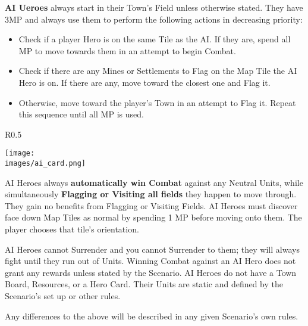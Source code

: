 \clearpage
\textbf{AI Ueroes} always start in their Town's Field unless otherwise stated.
They have 3MP and always use them to perform the following actions in decreasing priority:
\begin{itemize}
  \item Check if a player Hero is on the same Tile as the AI.
    If they are, spend all MP to move towards them in an attempt to begin Combat.
  \item Check if there are any Mines or Settlements to Flag on the Map Tile the AI Hero is on.
    If there are any, move toward the closest one and Flag it.
  \item Otherwise, move toward the player's Town in an attempt to Flag it.
Repeat this sequence until all MP is used.
\end{itemize}
\begin{wrapfigure}{R}{0.5\textwidth}
  \begin{center}
  \texttt{[image: \\images/ai\_card.png]}
  \end{center}
\end{wrapfigure}
AI Heroes always \textbf{automatically win Combat} against any Neutral Units, while simultaneously \textbf{Flagging or Visiting all fields} they happen to move through.
They gain no benefits from Flagging or Visiting Fields.
AI Heroes must discover face down Map Tiles as normal by spending 1 MP before moving onto them.
The player chooses that tile’s orientation.\par
AI Heroes cannot Surrender and you cannot Surrender to them;
they will always fight until they run out of Units.
Winning Combat against an AI Hero does not grant any rewards unless stated by the Scenario.
AI Heroes do not have a Town Board, Resources, or a Hero Card.
Their Units are static and defined by the Scenario’s set up or other rules.\par
Any differences to the above will be described in any given Scenario’s own rules.
